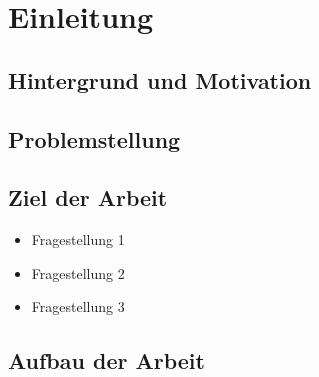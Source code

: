 \section{Einleitung}
\label{sec:einleitung}
\subsection{Hintergrund und Motivation}
\label{subsec:hintergrund}
\subsection{Problemstellung}
\label{subsec:problemstellung}
\subsection{Ziel der Arbeit}
\label{subsec:ziel}
\begin{itemize}
    \item[--] Fragestellung 1
    \item[--] Fragestellung 2
    \item[--] Fragestellung 3
\end{itemize}
\subsection{Aufbau der Arbeit}
\label{subsec:aufbau}
